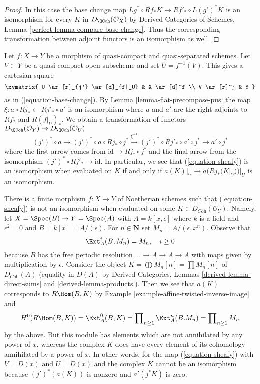\begin{proof}
In this case the base change map
$Lg^* \circ Rf_* K \longrightarrow Rf'_* \circ L(g')^*K$
is an isomorphism for every $K$ in $D_\QCoh(\mathcal{O}_X)$ by
Derived Categories of Schemes, Lemma \ref{perfect-lemma-compare-base-change}.
Thus the corresponding transformation between adjoint functors
is an isomorphism as well.
\end{proof}

\noindent
Let $f : X \to Y$ be a morphism of quasi-compact and quasi-separated
schemes. Let $V \subset Y$ be a quasi-compact open subscheme and set
$U = f^{-1}(V)$. This gives a cartesian square
$$
\xymatrix{
U \ar[r]_{j'} \ar[d]_{f|_U} & X \ar[d]^f \\
V \ar[r]^j & Y
}
$$
as in (\ref{equation-base-change}). By Lemma \ref{lemma-flat-precompose-pus}
the map $\xi : a \circ Rj_* \leftarrow Rj'_* \circ a'$ is an isomorphism
where $a$ and $a'$ are the right adjoints to
$Rf_*$ and $R(f|_U)_*$. We obtain a transformation
of functors $D_\QCoh(\mathcal{O}_Y) \to D_\QCoh(\mathcal{O}_U)$
\begin{equation}
\label{equation-sheafy}
(j')^* \circ a \to
(j')^* \circ a \circ Rj_* \circ j^* \xrightarrow{\xi^{-1}}
(j')^* \circ Rj'_* \circ a' \circ j^* \to a' \circ j^*
\end{equation}
where the first arrow comes from $\text{id} \to Rj_* \circ j^*$
and the final arrow from the isomorphism $(j')^* \circ Rj'_* \to \text{id}$.
In particular, we see that (\ref{equation-sheafy}) is an isomorphism
when evaluated on $K$ if and only if $a(K)|_U \to a(Rj_*(K|_V))|_U$
is an isomorphism.

\begin{example}
\label{example-not-supported-on-inverse-image}
There is a finite morphism $f : X \to Y$ of Noetherian schemes
such that (\ref{equation-sheafy}) is not an isomorphism
when evaluated on some
$K \in D_{\textit{Coh}}(\mathcal{O}_Y)$.
Namely, let $X = \Spec(B) \to Y = \Spec(A)$ with
$A = k[x, \epsilon]$ where $k$ is a field and $\epsilon^2 = 0$ and
$B = k[x] = A/(\epsilon)$. For $n \in \mathbf{N}$ set
$M_n = A/(\epsilon, x^n)$. Observe that
$$
\Ext^i_A(B, M_n) = M_n,\quad i \geq 0
$$
because $B$ has the free periodic resolution
$\ldots \to A \to A \to A$ with maps given by multiplication by $\epsilon$.
Consider the object
$K = \bigoplus M_n[n] = \prod M_n[n]$
of $D_{\textit{Coh}}(A)$ (equality in $D(A)$ by
Derived Categories, Lemmas \ref{derived-lemma-direct-sums} and
\ref{derived-lemma-products}). Then we see that $a(K)$ corresponds
to $R\Hom(B, K)$ by Example \ref{example-affine-twisted-inverse-image} and
$$
H^0(R\Hom(B, K)) = \Ext^0_A(B, K) =
\prod\nolimits_{n \geq 1} \Ext^n_A(B. M_n) = 
\prod\nolimits_{n \geq 1} M_n
$$
by the above. But this module has elements which are not
annihilated by any power of $x$, whereas the complex $K$
does have every element of its cohomology annihilated by
a power of $x$. In other words, for the map (\ref{equation-sheafy})
with $V = D(x)$ and $U = D(x)$ and the complex $K$ cannot
be an isomorphism because $(j')^*(a(K))$ is nonzero and
$a'(j^*K)$ is zero.
\end{example}

